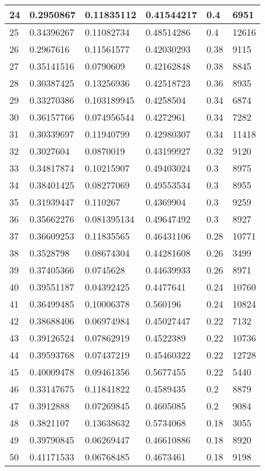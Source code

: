 \begin{longtable}{|l|l|l|l|l|l|}
24 & 0.2950867 & 0.11835112 & 0.41544217 & 0.4 & 6951 \\ \hline 
25 & 0.34396267 & 0.11082734 & 0.48514286 & 0.4 & 12616 \\ \hline 
26 & 0.2967616 & 0.11561577 & 0.42030293 & 0.38 & 9115 \\ \hline 
27 & 0.35141516 & 0.0790609 & 0.42162848 & 0.38 & 8845 \\ \hline 
28 & 0.30387425 & 0.13256936 & 0.42518723 & 0.36 & 8935 \\ \hline 
29 & 0.33270386 & 0.103189945 & 0.4258504 & 0.34 & 6874 \\ \hline 
30 & 0.36157766 & 0.074956544 & 0.4272961 & 0.34 & 7282 \\ \hline 
31 & 0.30339697 & 0.11940799 & 0.42980307 & 0.34 & 11418 \\ \hline 
32 & 0.3027604 & 0.0870019 & 0.43199927 & 0.32 & 9120 \\ \hline 
33 & 0.34817874 & 0.10215907 & 0.49403024 & 0.3 & 8975 \\ \hline 
34 & 0.38401425 & 0.08277069 & 0.49553534 & 0.3 & 8955 \\ \hline 
35 & 0.31939447 & 0.110267 & 0.4369904 & 0.3 & 9259 \\ \hline 
36 & 0.35662276 & 0.081395134 & 0.49647492 & 0.3 & 8927 \\ \hline 
37 & 0.36609253 & 0.11835565 & 0.46431106 & 0.28 & 10771 \\ \hline 
38 & 0.3528798 & 0.08674304 & 0.44281608 & 0.26 & 3499 \\ \hline 
39 & 0.37405366 & 0.0745628 & 0.44639933 & 0.26 & 8971 \\ \hline 
40 & 0.39551187 & 0.04392425 & 0.4477641 & 0.24 & 10760 \\ \hline 
41 & 0.36499485 & 0.10006378 & 0.560196 & 0.24 & 10824 \\ \hline 
42 & 0.38688406 & 0.06974984 & 0.45027447 & 0.22 & 7132 \\ \hline 
43 & 0.39126524 & 0.07862919 & 0.4522389 & 0.22 & 10736 \\ \hline 
44 & 0.39593768 & 0.07437219 & 0.45460322 & 0.22 & 12728 \\ \hline 
45 & 0.40009478 & 0.09461356 & 0.5677455 & 0.22 & 5440 \\ \hline 
46 & 0.33147675 & 0.11841822 & 0.4589435 & 0.2 & 8879 \\ \hline 
47 & 0.3912888 & 0.07269845 & 0.4605085 & 0.2 & 9084 \\ \hline 
48 & 0.3821107 & 0.13638632 & 0.5734068 & 0.18 & 3055 \\ \hline 
49 & 0.39790845 & 0.06269447 & 0.46610886 & 0.18 & 8920 \\ \hline 
50 & 0.41171533 & 0.06768485 & 0.4673461 & 0.18 & 9198 \\ \hline 
\end{longtable}